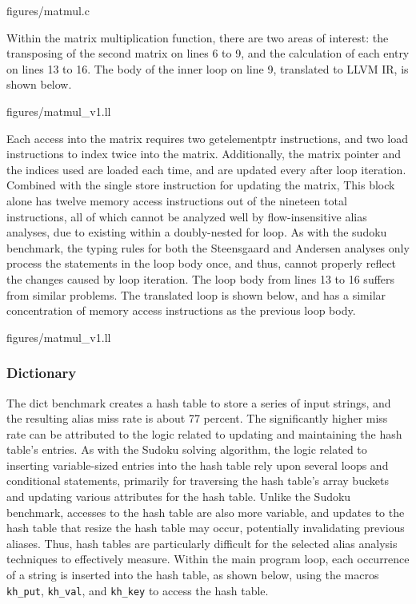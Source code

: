  {figures/matmul.c}

Within the matrix multiplication function, there are two areas of interest: the transposing of the second matrix on lines 6 to 9, and the calculation of each entry on lines 13 to 16. The body of the inner loop on line 9, translated to LLVM IR, is shown below.

 {figures/matmul_v1.ll}

Each access into the matrix requires two getelementptr instructions, and two load instructions to index twice into the matrix. Additionally, the matrix pointer and the indices used are loaded each time, and are updated every after loop iteration. Combined with the single store instruction for updating the matrix, This block alone has twelve memory access instructions out of the nineteen total instructions, all of which cannot be analyzed well by flow-insensitive alias analyses, due to existing within a doubly-nested for loop. As with the sudoku benchmark, the typing rules for both the Steensgaard and Andersen analyses only process the statements in the loop body once, and thus, cannot properly reflect the changes caused by loop iteration. The loop body from lines 13 to 16 suffers from similar problems. The translated loop is shown below, and has a similar concentration of memory access instructions as the previous loop body.

 {figures/matmul\_v1.ll}

\subsubsection{Dictionary}
The dict benchmark creates a hash table to store a series of input strings, and the resulting alias miss rate is about 77 percent. The significantly higher miss rate can be attributed to the logic related to updating and maintaining the hash table's entries. As with the Sudoku solving algorithm, the logic related to inserting variable-sized entries into the hash table rely upon several loops and conditional statements, primarily for traversing the hash table's array buckets and updating various attributes for the hash table. Unlike the Sudoku benchmark, accesses to the hash table are also more variable, and updates to the hash table that resize the hash table may occur, potentially invalidating previous aliases. Thus, hash tables are particularly difficult for the selected alias analysis techniques to effectively measure. Within the main program loop, each occurrence of a string is inserted into the hash table, as shown below, using the macros \texttt{kh\_put}, \texttt{kh\_val}, and \texttt{kh\_key} to access the hash table.

